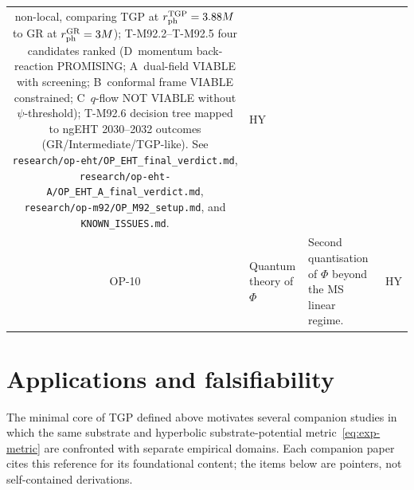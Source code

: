 \documentclass[11pt,a4paper]{article}
\renewcommand{\Phi}{\varPhi}
\begin{document}
\begin{center}
\begin{longtable}{@{}clp{8.5cm}c@{}}
  non-local, comparing TGP at $r_{\rm ph}^{\rm TGP}=3.88M$ to GR at
  $r_{\rm ph}^{\rm GR}=3M$);
  T-M92.2--T-M92.5 four candidates ranked (D~momentum back-reaction
  PROMISING; A~dual-field VIABLE with screening; B~conformal frame
  VIABLE constrained; C~$q$-flow NOT VIABLE without $\psi$-threshold);
  T-M92.6 decision tree mapped to ngEHT 2030--2032 outcomes
  (GR/Intermediate/TGP-like).
  See \texttt{research/op-eht/OP\_EHT\_final\_verdict.md},
  \texttt{research/op-eht-A/OP\_EHT\_A\_final\_verdict.md},
  \texttt{research/op-m92/OP\_M92\_setup.md}, and
  \texttt{KNOWN\_ISSUES.md}.
  & \textsf{HY}\\
OP-10 & Quantum theory of $\Phi$
  & Second quantisation of $\Phi$ beyond the MS linear regime.
  & \textsf{HY}\\
\bottomrule
\end{longtable}
\end{center}

\section{Applications and falsifiability}\label{sec:applications}

The minimal core of TGP defined above motivates several companion
studies in which the same substrate and hyperbolic
substrate-potential metric~\eqref{eq:exp-metric} are
confronted with separate empirical domains. Each companion paper cites
this reference for its foundational content; the items below are
pointers, not self-contained derivations.
\end{document}
